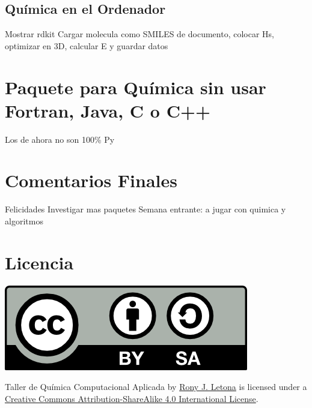\documentclass[10pt,letterpaper]{article}
\begin{document}
\subsection{Qu\'imica en el Ordenador}
Mostrar rdkit
Cargar molecula como SMILES de documento, colocar Hs, optimizar en 3D, calcular E y guardar datos
\section{Paquete para Qu\'imica sin usar Fortran, Java, C o C++}
Los de ahora no son 100\% Py
\section{Comentarios Finales}
Felicidades
Investigar mas paquetes
Semana entrante: a jugar con quimica y algoritmos

\section*{Licencia}

\noindent \includegraphics{img/cc_big.png}

\noindent Taller de Qu\'imica Computacional Aplicada by \href{http://github.com/zronyj/TQCA}{Rony J. Letona} is licensed under a \href{http://creativecommons.org/licenses/by-sa/4.0/}{Creative Commons Attribution-ShareAlike 4.0 International License}.
\end{document}
